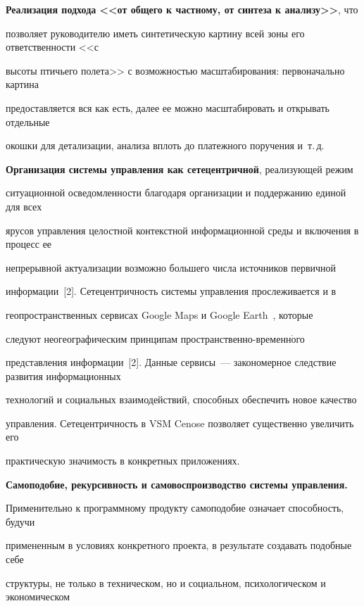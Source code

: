   


  \textbf{Реализация подхода <<от общего к частному, от синтеза к анализу>>}, что 


позволяет руководителю иметь синтетическую картину всей зоны его ответственности <<с 


высоты птичьего полета>> с возможностью масштабирования: первоначально картина 


предоставляется вся как есть, далее ее можно масштабировать и открывать отдельные 


окошки для детализации, анализа вплоть до платежного поручения и~т.\,д. 


  


  \textbf{Организация сис\-те\-мы управ\-ле\-ния как сетецентричной}, реализующей режим 


ситуационной осведомленности благодаря организации и поддержанию единой для всех 


ярусов управления целостной контекстной информационной среды и включения в процесс ее 


непрерывной актуализации возможно большего числа источников первичной 


информации~[2]. Сетецентричность сис\-те\-мы управ\-ле\-ния прослеживается и в 


геопространственных сервисах Google Maps и Google Earth~\cite{5-kl2, 6-kl2}, которые 


следуют неогеографическим принципам про\-стран\-ст\-вен\-но-вре\-мен\-н$\acute{\mbox{о}}$\-го 


представления  информации~[2]. Данные сервисы~--- закономерное следствие развития информационных 


технологий и социальных взаимодействий, способных обеспечить новое качество 


управления. Сетецентричность в VSM Cenose позволяет существенно увеличить его 


практическую значимость в конкретных приложениях.


  


  \textbf{Самоподобие, рекурсивность и самовоспроизводство сис\-те\-мы управ\-ле\-ния.} 


Применительно к программному продукту самоподобие означает способность, будучи 


примененным в условиях конкретного проекта, в результате создавать подобные себе 


структуры, не только в техническом, но и социальном, психологическом и экономическом 


